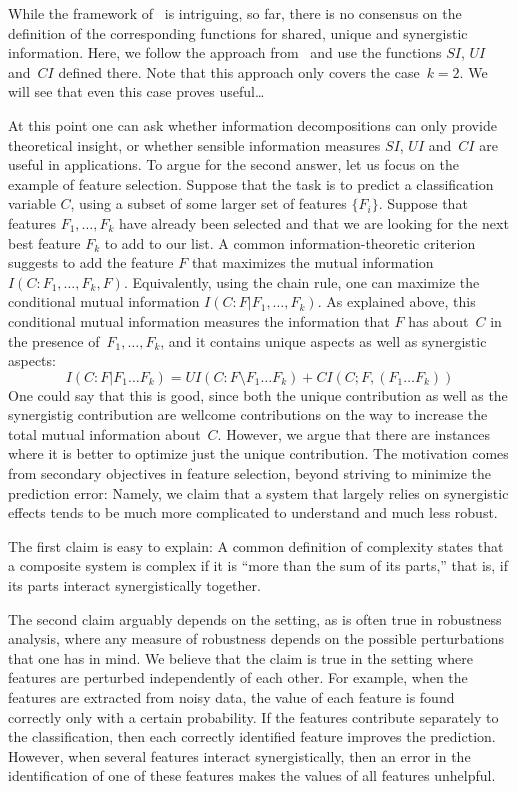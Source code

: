 \documentclass{article}
\begin{document}
While the framework of~\cite{WilliamsBeer:Nonneg_Decomposition_of_Multiinformation} is intriguing, so far, there is no
consensus on the definition of the corresponding functions for shared, unique and synergistic information.  Here, we
follow the approach from~\cite{BROJA13:Quantifying_unique_information} and use the functions $SI$, $UI$ and~$CI$ defined
there.  Note that this approach only covers the case~$k=2$.  We will see that even this case proves useful\dots

At this point one can ask whether information decompositions can only provide theoretical insight, or whether sensible
information measures $SI$, $UI$ and~$CI$ are useful in applications.  To argue for the second answer, let us focus on
the example of feature selection.  Suppose that the task is to predict a classification variable $C$, using a subset of
some larger set of features $\{F_{i}\}$.  Suppose that features $F_{1},\dots,F_{k}$ have already been selected and that
we are looking for the next best feature $F_{k}$ to add to our list.  A common information-theoretic criterion suggests
to add the feature $F$ that maximizes the mutual information~$I(C:F_{1},\dots,F_{k},F)$.  Equivalently, using the chain
rule, one can maximize the conditional mutual information $I(C:F|F_{1},\dots,F_{k})$.  As explained above, this
conditional mutual information measures the information that $F$ has about~$C$ in the presence of~$F_{1},\dots,F_{k}$,
and it contains unique aspects as well as synergistic aspects:
\begin{equation*}
  I(C:F|F_{1}\dots F_{k}) = UI(C:F\setminus F_{1}\dots F_{k}) + CI(C;F, (F_{1}\dots F_{k}))
\end{equation*}
One could say that this is good, since both the unique contribution as well as the synergistig contribution are wellcome
contributions on the way to increase the total mutual information about~$C$.  However, we argue that there are instances
where it is better to optimize just the unique contribution.  The motivation comes from secondary objectives in feature
selection, beyond striving to minimize the prediction error: Namely, we claim that a system that largely relies on
synergistic effects tends to be much more complicated to understand and much less robust.

The first claim is easy to explain: A common definition of complexity states that a composite system is complex if it is
``more than the sum of its parts,'' that is, if its parts interact synergistically together.

The second claim arguably depends on the setting, as is often true in robustness analysis, where any measure of
robustness depends on the possible perturbations that one has in mind.  We believe that the claim is true in the setting
where features are perturbed independently of each other.  For example, when the features are extracted from noisy data,
the value of each feature is found correctly only with a certain probability.  If the features contribute separately to
the classification, then each correctly identified feature improves the prediction.  However, when several features
interact synergistically, then an error in the identification of one of these features makes the values of all features
unhelpful.
\end{document}
